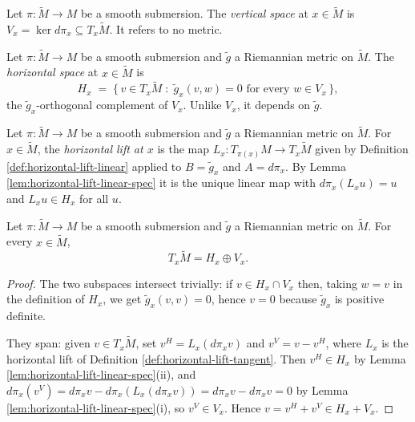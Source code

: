\begin{definition}
\label{def:vertical-space}
\leanok
{}
Let $\pi : \tilde{M} \to M$ be a smooth submersion. The \emph{vertical space} at $x \in \tilde{M}$ is $V_x = \ker d\pi_x \subseteq T_x\tilde{M}$. It refers to no metric.
\end{definition}

\begin{definition}
\label{def:horizontal-space}
\leanok
{}
Let $\pi : \tilde{M} \to M$ be a smooth submersion and $\tilde{g}$ a Riemannian metric on $\tilde{M}$. The \emph{horizontal space} at $x \in \tilde{M}$ is
\[
H_x \;=\; \{\, v \in T_x\tilde{M} \;:\; \tilde{g}_x(v,w) = 0 \text{ for every } w \in V_x \,\} ,
\]
the $\tilde{g}_x$-orthogonal complement of $V_x$. Unlike $V_x$, it depends on $\tilde{g}$.
\end{definition}

\begin{definition}
\label{def:horizontal-lift-tangent}
\leanok
{}
Let $\pi : \tilde{M} \to M$ be a smooth submersion and $\tilde{g}$ a Riemannian metric on $\tilde{M}$. For $x \in \tilde{M}$, the \emph{horizontal lift at $x$} is the map $L_x : T_{\pi(x)}M \to T_x\tilde{M}$ given by Definition \ref{def:horizontal-lift-linear} applied to $B = \tilde{g}_x$ and $A = d\pi_x$. By Lemma \ref{lem:horizontal-lift-linear-spec} it is the unique linear map with $d\pi_x(L_x u) = u$ and $L_x u \in H_x$ for all $u$.
\end{definition}

\begin{lemma}
\label{lem:tangent-space-horizontal-vertical-splitting}
\leanok
{}
Let $\pi : \tilde{M} \to M$ be a smooth submersion and $\tilde{g}$ a Riemannian metric on $\tilde{M}$. For every $x \in \tilde{M}$,
\[
T_x\tilde{M} = H_x \oplus V_x .
\]
\end{lemma}

\begin{proof}
\leanok
{}
The two subspaces intersect trivially: if $v \in H_x \cap V_x$ then, taking $w = v$ in the definition of $H_x$, we get $\tilde{g}_x(v,v) = 0$, hence $v = 0$ because $\tilde{g}_x$ is positive definite.

They span: given $v \in T_x\tilde{M}$, set $v^H = L_x(d\pi_x v)$ and $v^V = v - v^H$, where $L_x$ is the horizontal lift of Definition \ref{def:horizontal-lift-tangent}. Then $v^H \in H_x$ by Lemma \ref{lem:horizontal-lift-linear-spec}(ii), and $d\pi_x(v^V) = d\pi_x v - d\pi_x(L_x(d\pi_x v)) = d\pi_x v - d\pi_x v = 0$ by Lemma \ref{lem:horizontal-lift-linear-spec}(i), so $v^V \in V_x$. Hence $v = v^H + v^V \in H_x + V_x$.
\end{proof}


